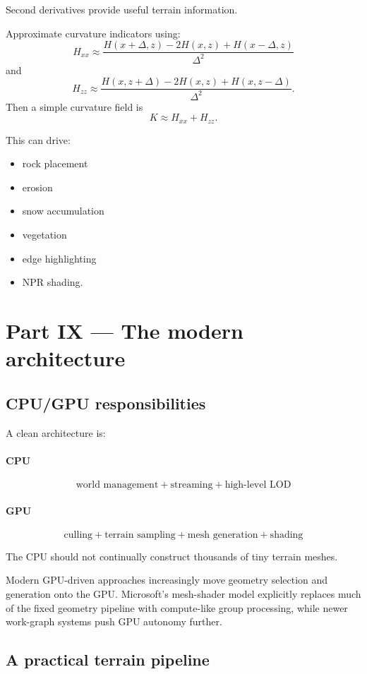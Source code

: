 \documentclass[12pt]{article}
\begin{document}
	Second derivatives provide useful terrain information.
	
	Approximate curvature indicators using:
	\[
	H_{xx} \approx \frac{H(x+\Delta,z)-2H(x,z)+H(x-\Delta,z)}{\Delta^2}
	\]
	and
	\[
	H_{zz} \approx \frac{H(x,z+\Delta)-2H(x,z)+H(x,z-\Delta)}{\Delta^2}.
	\]
	Then a simple curvature field is
	\[
	\boxed{
		K\approx H_{xx}+H_{zz}.
	}
	\]
	
	This can drive:
	\begin{itemize}
		\item rock placement
		\item erosion
		\item snow accumulation
		\item vegetation
		\item edge highlighting
		\item NPR shading.
	\end{itemize}
	
	\section*{Part IX — The modern architecture}
	
	\subsection{CPU/GPU responsibilities}
	
	A clean architecture is:
	
	\paragraph{CPU}
	\[
	\boxed{
		\text{world management} + \text{streaming} + \text{high-level LOD}
	}
	\]
	
	\paragraph{GPU}
	\[
	\boxed{
		\text{culling} + \text{terrain sampling} + \text{mesh generation} + \text{shading}
	}
	\]
	
	The CPU should not continually construct thousands of tiny terrain meshes.
	
	Modern GPU-driven approaches increasingly move geometry selection and generation onto the GPU. Microsoft's mesh-shader model explicitly replaces much of the fixed geometry pipeline with compute-like group processing, while newer work-graph systems push GPU autonomy further.
	
	\subsection{A practical terrain pipeline}
	
\end{document}
